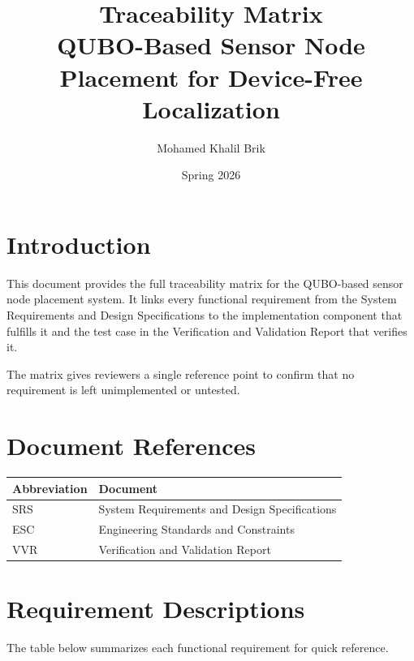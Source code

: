 \documentclass[12pt,a4paper]{article}
\title{
    \textbf{Traceability Matrix} \\[0.5em]
    \large QUBO-Based Sensor Node Placement for Device-Free Localization
}
\author{Mohamed Khalil Brik}
\date{Spring 2026}
\begin{document}
\maketitle
\tableofcontents
\newpage

\section{Introduction}

This document provides the full traceability matrix for the QUBO-based
sensor node placement system. It links every functional requirement from
the System Requirements and Design Specifications to the implementation
component that fulfills it and the test case in the Verification and
Validation Report that verifies it.

The matrix gives reviewers a single reference point to confirm that no
requirement is left unimplemented or untested.

\section{Document References}

\begin{table}[h!]
\centering
\renewcommand{\arraystretch}{1.3}
\begin{tabular}{@{}ll@{}}
\toprule
\textbf{Abbreviation} & \textbf{Document} \\
\midrule
SRS & System Requirements and Design Specifications \\
ESC & Engineering Standards and Constraints \\
VVR & Verification and Validation Report \\
\bottomrule
\end{tabular}
\end{table}

\section{Requirement Descriptions}

The table below summarizes each functional requirement for quick reference.
\end{document}
